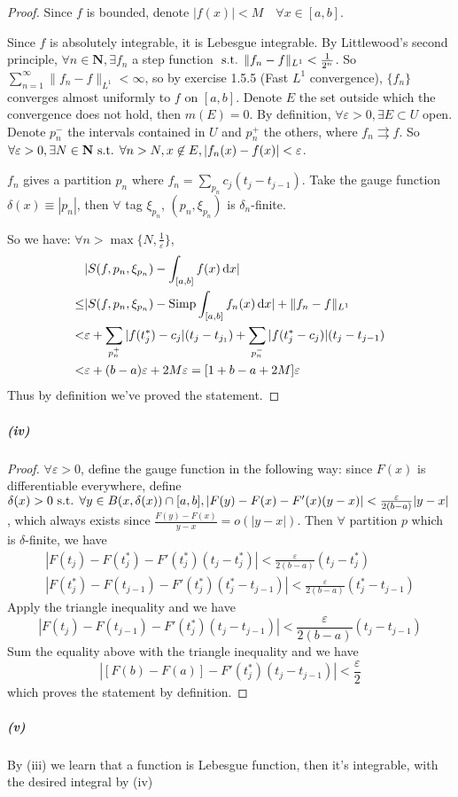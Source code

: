 \documentclass{article}
\begin{document}
\begin{proof}
Since $f$ is bounded, denote $|f(x)|<M\quad \forall x\in [a,b]$.

Since $f$ is absolutely integrable, it is Lebesgue integrable. By Littlewood's second principle, $\forall n\in\mathbf{N}, \exists f_n$ a step function $\text{ s.t. } \|f_n-f\|_{L^1}<\frac{1}{2^n}$. So $\sum\limits_{n=1}^\infty \|f_n-f\|_{L^1}<\infty$, so by exercise 1.5.5 (Fast $L^1$ convergence), $\{f_n\}$ converges almost uniformly to $f$ on $[a,b]$. Denote $E$ the set outside which the convergence does not hold, then $m(E)=0$. By definition, $\forall\varepsilon>0,\exists E\subset U$ open. Denote $p_n^-$ the intervals contained in $U$ and $p_n^+$ the others, where $f_n\rightrightarrows f$. So $\forall\varepsilon>0, \exists N\in\mathbf{N}\text{ s.t. } \forall n>N, x\not\in E, |f_n(x)-f(x)|<\varepsilon$.

$f_n$ gives a partition $p_n$ where $f_n=\sum\limits_{p_n}c_j(t_j-t_{j-1})$. Take the gauge function $\delta(x)\equiv|p_n|$, then $\forall$ tag $\xi_{p_n}$, $(p_n,\xi_{p_n})$ is $\delta_n$-finite.

So we have: $\forall n>\max\{N,\frac{1}{\varepsilon}\}$, 
\[\begin{aligned}
&|S(f,p_n,\xi_{p_n})-\int_{[a,b]}f(x)\,\mathrm{d} x|\\
\leq&|S(f,p_n,\xi_{p_n})-\mathrm{Simp}\int_{[a,b]}f_n(x)\,\mathrm{d} x|+\|f_n-f\|_{L^1}\\
<&\varepsilon + \sum_{p_n^+}|f(t^*_j)-c_j|(t_j-t_{j_1})+\sum_{p_n^-}|f(t^*_j-c_j)|(t_j-t_{j-1})\\
<&\varepsilon+(b-a)\varepsilon+2M\varepsilon=[1+b-a+2M]\varepsilon
\end{aligned}\] 
Thus by definition we've proved the statement.
\end{proof}
\subparagraph{(iv)}
\begin{proof}
$\forall\varepsilon>0$, define the gauge function in the following way: since $F(x)$ is differentiable everywhere, define $\delta(x)>0\text{ s.t. } \forall y\in B(x,\delta(x))\cap [a,b], |F(y)-F(x)-F'(x)(y-x)|<\frac{\varepsilon}{2(b-a)}|y-x|$, which always exists since $\frac{F(y)-F(x)}{y-x}=o(|y-x|)$. Then $\forall$ partition $p$ which is $\delta$-finite, we have 
\begin{gather*}
|F(t_j)-F(t^*_j)-F'(t^*_j)(t_j-t^*_j)|<\frac{\varepsilon}{2(b-a)}(t_j-t^*_j)\\
|F(t^*_j)-F(t_{j-1})-F'(t^*_j)(t^*_j-t_{j-1})|<\frac{\varepsilon}{2(b-a)}(t^*_j-t_{j-1})
\end{gather*}
Apply the triangle inequality and we have 
\[|F(t_j)-F(t_{j-1})-F'(t^*_j)(t_j-t_{j-1})|<\frac{\varepsilon}{2(b-a)}(t_j-t_{j-1})\]
Sum the equality above with the triangle inequality and we have
\[|[F(b)-F(a)]-F'(t^*_j)(t_j-t_{j-1})|<\frac{\varepsilon}{2}\]
which proves the statement by definition.
\end{proof}
\subparagraph{(v)}
By (iii) we learn that a function is Lebesgue function, then it's \HK integrable, with the desired integral by (iv)
\end{document}
